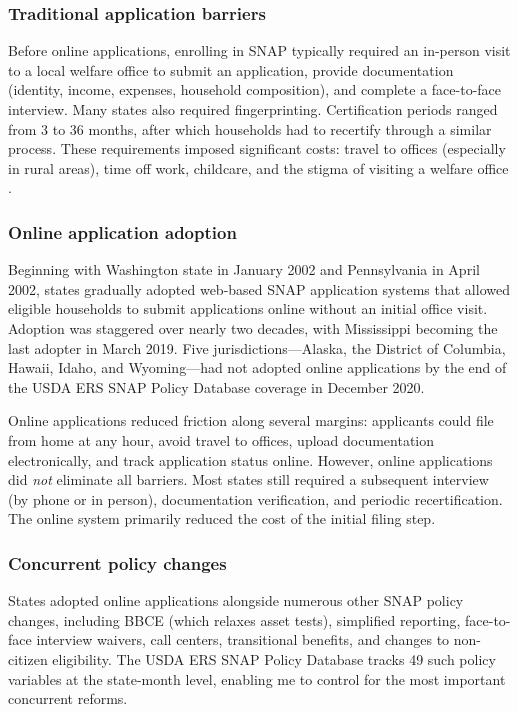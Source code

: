 \documentclass[12pt]{article}
\begin{document}
\subsubsection*{Traditional application barriers} Before online applications, enrolling in SNAP typically required an in-person visit to a local welfare office to submit an application, provide documentation (identity, income, expenses, household composition), and complete a face-to-face interview. Many states also required fingerprinting. Certification periods ranged from 3 to 36 months, after which households had to recertify through a similar process. These requirements imposed significant costs: travel to offices (especially in rural areas), time off work, childcare, and the stigma of visiting a welfare office \citep{currie2006}.

\subsubsection*{Online application adoption} Beginning with Washington state in January 2002 and Pennsylvania in April 2002, states gradually adopted web-based SNAP application systems that allowed eligible households to submit applications online without an initial office visit. Adoption was staggered over nearly two decades, with Mississippi becoming the last adopter in March 2019. Five jurisdictions---Alaska, the District of Columbia, Hawaii, Idaho, and Wyoming---had not adopted online applications by the end of the USDA ERS SNAP Policy Database coverage in December 2020.

Online applications reduced friction along several margins: applicants could file from home at any hour, avoid travel to offices, upload documentation electronically, and track application status online. However, online applications did \textit{not} eliminate all barriers. Most states still required a subsequent interview (by phone or in person), documentation verification, and periodic recertification. The online system primarily reduced the cost of the initial filing step.

\subsubsection*{Concurrent policy changes} States adopted online applications alongside numerous other SNAP policy changes, including BBCE (which relaxes asset tests), simplified reporting, face-to-face interview waivers, call centers, transitional benefits, and changes to non-citizen eligibility. The USDA ERS SNAP Policy Database tracks 49 such policy variables at the state-month level, enabling me to control for the most important concurrent reforms.
\end{document}
